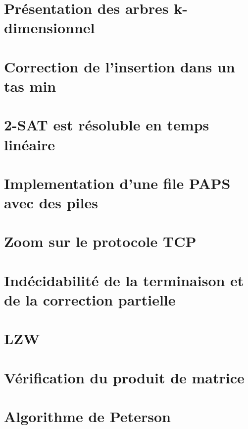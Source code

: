 \chapter{Présentation des arbres k-dimensionnel} \label{D54}


\chapter{Correction de l'insertion dans un tas min} \label{D55}


\chapter{2-SAT est résoluble en temps linéaire} \label{D56}


\chapter{Implementation d'une file PAPS avec des piles} \label{D57}


\chapter{Zoom sur le protocole TCP} \label{D58}


\chapter{Indécidabilité de la terminaison et de la correction partielle} \label{D59}


\chapter{LZW} \label{D60}


\chapter{Vérification du produit de matrice}\label{D61}


\chapter{Algorithme de Peterson}\label{D62}



